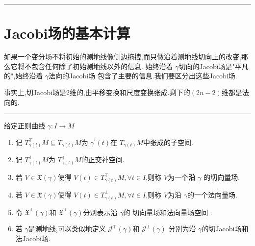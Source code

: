 \documentclass[../../几何与拓扑.tex]{subfiles}
\begin{document}
\hspace*{\fill} 
\hrule
\hspace*{\fill}

\section{Jacobi场的基本计算}

如果一个变分场不将初始的测地线像侧边拖拽,而只做沿着测地线切向上的改变,那么它将不包含任何除了初始测地线以外的信息. 始终沿着 \(   \gamma   \)切向的Jacobi场是"平凡的",始终沿着 \(   \gamma   \)法向的Jacobi场 包含了主要的信息.我们要区分出这些Jacobi场. 

事实上,切Jacobi场是2维的,由平移变换和尺度变换张成.剩下的\(  \left( 2n-2 \right)   \)维都是法向的.


\hspace*{\fill} 
\hrule
\hspace*{\fill}


\begin{definition}
    给定正则曲线 \(   \gamma :I\to M  \)
    \begin{enumerate}
        \item 记 \(  T_{ \gamma \left( t \right) }^{\top}M\subseteq T_{ \gamma \left( t \right) }M  \)为  \(   \gamma ^{\prime} \left( t \right)   \)在 \(  T_{ \gamma \left( t \right) }M  \)中张成的子空间.
        \item 记 \(  T_{ \gamma \left( t \right) }^{\perp}M  \)为 \(  T_{ \gamma \left( t \right) }^{\top}M  \)的正交补空间.
        \item 若 \(  V \in \mathfrak{X}\left(  \gamma  \right)   \)使得 \(  V\left( t \right)\in T_{ \gamma \left( t \right) }^{\top}M,\forall  t\in I   \),则称 \(  V  \)为一个\textbf{沿 \(   \gamma   \) }的切向量场.
        \item 若 \(  V \in \mathfrak{X}\left(  \gamma  \right)   \)使得 \(  V\left( t \right)\in T_{ \gamma \left( t \right) }^{\perp}M,\forall t \in I   \),则称 \(  V  \)为沿 \(   \gamma   \)的一个法向量场.
        \item 令 \(  \mathfrak{X}^{\top}\left(  \gamma  \right)   \)和 \(  \mathfrak{X}^{\perp}\left(  \gamma  \right)   \)分别表示沿 \(   \gamma   \)的 切向量场和法向量场空间   .
        \item 若 \(   \gamma   \)是测地线,可以类似地定义 \(  \mathscr{J}^{\top}\left(  \gamma  \right)   \)和 \(  \mathscr{J}^{\perp}\left(  \gamma  \right)   \)      分别为沿 \(   \gamma   \)的切Jacobi场和法Jacobi场.          
    \end{enumerate}
     
\end{definition}
\end{document}

